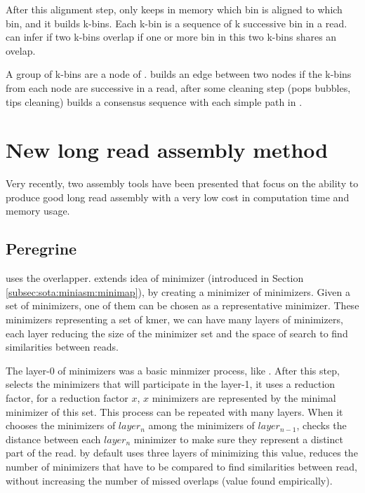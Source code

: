\documentclass[main]{subfiles}
\begin{document}
After this alignment step, \wtdbg only keeps in memory which bin is aligned to which bin, and it builds k-bins. Each k-bin is a sequence of k successive bin in a read. \wtdbg can infer if two k-bins overlap if one or more bin in this two k-bins shares an ovelap.

A group of k-bins are a node of . \wtdbg builds an edge between two nodes if the k-bins from each node are successive in a read, after some cleaning step (pops bubbles, tips cleaning) \wtdbg builds a consensus sequence with each simple path in .

\section{New long read assembly method} \label{sec:sota:new_assembly_tools}

Very recently, two assembly tools have been presented that focus on the ability to produce good long read assembly with a very low cost in computation time and memory usage.

\subsection{Peregrine}

\newcommand{\shimmer}{}

\peregrine \cite{Peregrine} uses the \shimmer overlapper. \shimmer extends idea of minimizer (introduced in Section \ref{subsec:sota:miniasm:minimap}), by creating a minimizer of minimizers.
Given a set of minimizers, one of them can be chosen as a representative minimizer.
These minimizers representing a set of kmer, we can have many layers of minimizers, each layer reducing the size of the minimizer set and the space of search to find similarities between reads.

The layer-0 of minimizers was a basic minmizer process, like \minimap. After this step, \shimmer selects the minimizers that will participate in the layer-1, it uses a reduction factor, for a reduction factor $x$, $x$ minimizers are represented by the minimal minimizer of this set. This process can be repeated with many layers. When it chooses the minimizers of $layer_n$ among the minimizers of $layer_{n-1}$, \shimmer checks the distance between each $layer_n$ minimizer to make sure they represent a distinct part of the read. \shimmer by default uses three layers of minimizing this value, reduces the number of minimizers that have to be compared to find similarities between read, without increasing the number of missed overlaps (value found empirically).
\end{document}

